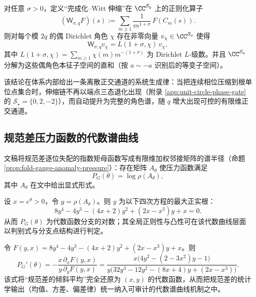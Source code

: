 \begin{theorem}[根单位点角色对角化]\label{thm:root-unit-character-diagonalization}
对任意 \(\sigma>0\)，定义“完成化--Witt 伸缩”在 \(\CC^{\mathcal{S}_q}\) 上的正则化算子
\begin{equation}\label{eq:root-unit-W-sigma}
(\mathsf{W}_{\sigma,q}F)(s):=\sum_{m\ge 1}\frac{1}{m^{1+\sigma}}\,F(C_m(s)).
\end{equation}
则对每个模 \(2q\) 的偶 Dirichlet 角色 \(\chi\) 存在非零向量 \(v_\chi\in\CC^{\mathcal{S}_q}\) 使得
\[
\mathsf{W}_{\sigma,q}v_\chi=L(1+\sigma,\chi)\,v_\chi,
\]
其中 \(L(1+\sigma,\chi)=\sum_{m\ge 1}\chi(m)m^{-(1+\sigma)}\) 为 Dirichlet \(L\)-级数。并且 \(\CC^{\mathcal{S}_q}\) 分解为这些偶角色本征子空间的直和（按 \(a\sim -a\) 识别后的等变子空间）。
\end{theorem}

该结论在体系内部给出一条离散正交通道的系统生成律：当把连续相位压缩到根单位点集合时，伸缩链不再以端点三态退化出现（附录 \ref{app:unit-circle-phase-gate} 的 \(\mathcal{S}_\star=\{0,2,-2\}\)），而自动提升为完整的角色谱，随 \(q\) 增大出现可控的有限维正交通道。

\subsection{规范差压力函数的代数谱曲线}\label{subsec:gauge-pressure-algebraic-curve}

文稿将规范差逐位失配的指数矩母函数写成有限维加权邻接矩阵的谱半径（命题 \ref{prop:fold-gauge-anomaly-pressure}）：存在矩阵 \(A_\theta\) 使压力函数满足
\[
P_G(\theta)=\log\rho(A_\theta),
\]
其中 \(A_\theta\) 在文中给出显式形式。

\begin{theorem}[压力谱曲线的四次代数方程]\label{thm:gauge-pressure-quartic}
设 \(x=e^\theta>0\)，令 \(y=\rho(A_\theta)\)。则 \(y\) 为以下四次方程的最大正实根：
\begin{equation}\label{eq:gauge-pressure-quartic}
8y^4-4y^3-(4x+2)y^2+(2x-x^3)y+x=0.
\end{equation}
从而 \(P_G(\theta)\) 为代数函数分支的对数；其全局正则性与凸性可在该代数曲线层面以判别式与分支点结构进行判定。
\end{theorem}

\begin{corollary}[倾斜平均失配率的闭式表达]\label{cor:gauge-pressure-tilt-derivative}
令 \(F(y,x)=8y^4-4y^3-(4x+2)y^2+(2x-x^3)y+x\)。则
\begin{equation}\label{eq:gauge-pressure-P-prime}
P_G'(\theta)=-\frac{x\,\partial_x F(y,x)}{y\,\partial_y F(y,x)}
=\frac{x\bigl(4y^2-(2-3x^2)y-1\bigr)}{y\bigl(32y^3-12y^2-(8x+4)y+(2x-x^3)\bigr)}.
\end{equation}
该式将“规范差的倾斜平均”完全还原为 \((x,y)\) 的代数函数，从而把规范差的统计学输出（均值、方差、偏差律）统一纳入可审计的代数谱曲线机制之中。
\end{corollary}

